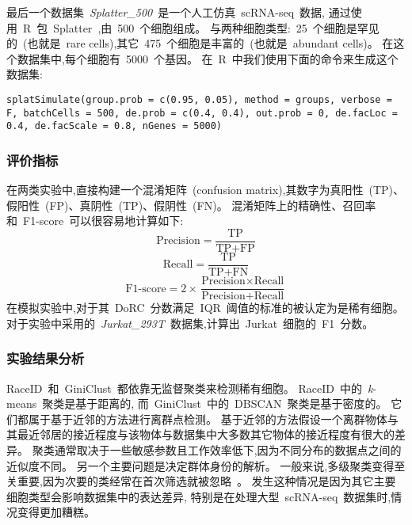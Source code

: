 最后一个数据集~\textit{Splatter\_500}~是一个人工仿真~scRNA-seq~数据,
通过使用~R~包~Splatter~\cite{zappia2017splatter},由~500~个细胞组成。
与两种细胞类型:~25~个细胞是罕见的~(也就是~rare cells),其它~475~个细胞是丰富的~(也就是~abundant cells)。
在这个数据集中,每个细胞有~5000~个基因。
在~R~中我们使用下面的命令来生成这个数据集:

\texttt{splatSimulate(group.prob = c(0.95, 0.05), method = groups, 
verbose = F, batchCells = 500, de.prob = c(0.4, 0.4), out.prob = 0, 
de.facLoc = 0.4, de.facScale = 0.8, nGenes = 5000)}

\subsubsection{评价指标}

在两类实验中,直接构建一个混淆矩阵~(confusion matrix),其数字为真阳性~(TP)、假阳性~(FP)、真阴性~(TP)、假阴性~(FN)。
混淆矩阵上的精确性、召回率和~F1-score~可以很容易地计算如下:
\begin{equation}
    \label{eq:precision}
    \text{Precision} = \frac{\text{TP}}{\text{TP} + \text{FP}}
\end{equation}
\begin{equation}
    \label{eq:recall}
    \text{Recall} = \frac{\text{TP}}{\text{TP} + \text{FN}}
\end{equation}
\begin{equation}
\label{eq:f1score}
\text{F1-score} = 2 \times \frac{\text{Precision} \times \text{Recall}}{ \text{Precision} + \text{Recall}}
\end{equation}
在模拟实验中,对于其~DoRC~分数满足~IQR~阈值的标准的被认定为是稀有细胞。
对于实验中采用的~\textit{Jurkat\_293T}~数据集,计算出~Jurkat~细胞的~F1~分数。

\subsubsection{实验结果分析}

\label{subsec:dorc}
RaceID~和~GiniClust~都依靠无监督聚类来检测稀有细胞。
RaceID~中的~\textit{k}-means~聚类是基于距离的,
而~GiniClust~中的~DBSCAN~聚类是基于密度的。
它们都属于基于近邻的方法进行离群点检测。
基于近邻的方法假设一个离群物体与其最近邻居的接近程度与该物体与数据集中大多数其它物体的接近程度有很大的差异。
聚类通常取决于一些敏感参数且工作效率低下,因为不同分布的数据点之间的近似度不同。
另一个主要问题是决定群体身份的解析。
一般来说,多级聚类变得至关重要,因为次要的类经常在首次筛选就被忽略~\cite{campbell2017molecular}。
发生这种情况是因为其它主要细胞类型会影响数据集中的表达差异,
特别是在处理大型~scRNA-seq~数据集时,情况变得更加糟糕。

